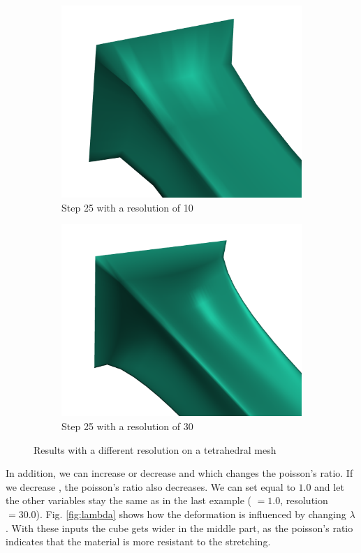 \begin{figure}[!ht]
\centering
\begin{subfigure}{.47\textwidth}
  \centering
  \includegraphics[width=.8\linewidth]{resources/default_zoom_tet.png}  
  \caption{Step 25 with a resolution of 10}
  \label{fig:res_1}
\end{subfigure}
\begin{subfigure}{.47\textwidth}
  \centering
  \includegraphics[width=.8\linewidth]{resources/res_zoom_tet.png}  
  \caption{Step 25 with a resolution of 30}
  \label{fig:res_2}
\end{subfigure}
\caption{Results with a different resolution on a tetrahedral mesh}
\label{fig:res}
\end{figure}


In addition, we can increase or decrease \textit{\mu} and \textit{\lambda} which changes the poisson's ratio. If we decrease \textit{\lambda}, the poisson's ratio also decreases. We can set \textit{\lambda} equal to $1.0$ and let the other variables stay the same as in the last example (\textit{\mu} $= 1.0$, resolution $= 30.0$). Fig. \ref{fig:lambda} shows how the deformation is influenced by changing $\lambda$. With these inputs the cube gets wider in the middle part, as the poisson's ratio indicates that the material is more resistant to the stretching.

